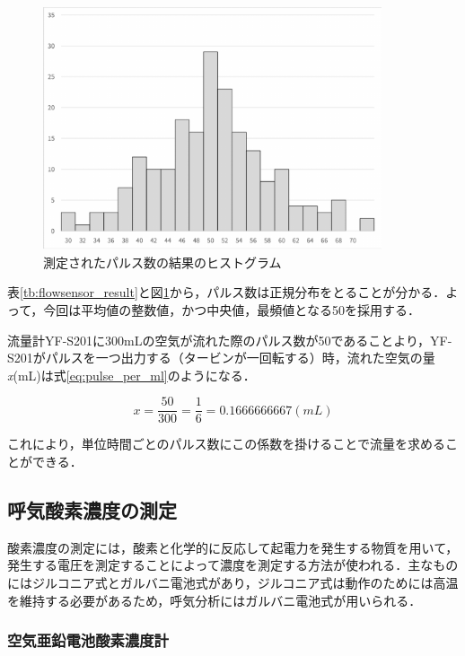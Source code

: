 \begin{figure}[H]
  \begin{center}
    \caption{測定されたパルス数の結果のヒストグラム}
    \label{fig:flowsensor_histogram}
    \includegraphics[width=10cm]{fig/flowsensor_histogram}
  \end{center}
\end{figure}

表\ref{tb:flowsensor_result}と図\ref{fig:flowsensor_histogram}から，パルス数は正規分布をとることが分かる．よって，今回は平均値の整数値，かつ中央値，最頻値となる50を採用する．

流量計YF-S201に300mLの空気が流れた際のパルス数が50であることより，YF-S201がパルスを一つ出力する（タービンが一回転する）時，流れた空気の量{\it x}(mL)は式\ref{eq:pulse_per_ml}のようになる．

\begin{equation}
  \label{eq:pulse_per_ml}
  x = \frac{50}{300} = \frac{1}{6} = 0.1666666667 (mL)
\end{equation}

これにより，単位時間ごとのパルス数にこの係数を掛けることで流量を求めることができる．

\subsection{呼気酸素濃度の測定}

酸素濃度の測定には，酸素と化学的に反応して起電力を発生する物質を用いて，発生する電圧を測定することによって濃度を測定する方法が使われる．主なものにはジルコニア式とガルバニ電池式があり，ジルコニア式は動作のためには高温を維持する必要があるため，呼気分析にはガルバニ電池式が用いられる．

\subsubsection{空気亜鉛電池酸素濃度計}
\label{sec:o2sensor_a-5s}

